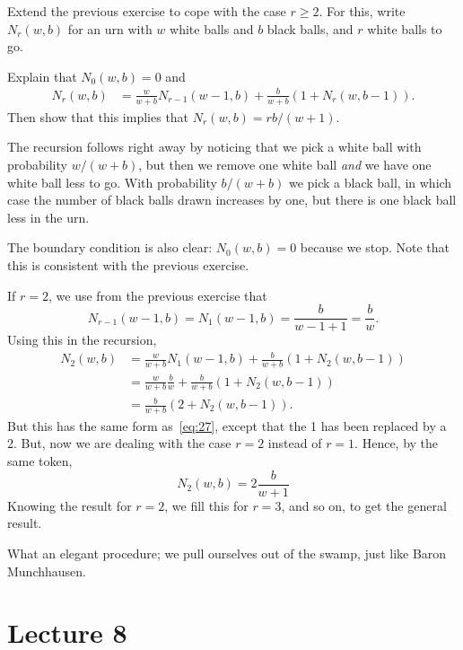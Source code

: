 \begin{exercise}
Extend the previous exercise to cope with the case $r\geq 2$.
For this, write $N_{r}(w,b)$ for an urn with $w$ white balls and $b$ black balls, and $r$ white balls to go.
\begin{hint}
Explain that $N_{0}(w,b) = 0$ and
\begin{align}
  N_r(w,b) &= \frac{w}{w+b} N_{r-1}(w-1, b) +  \frac{b}{w+b} (1+N_{r}(w, b-1)).
\end{align}
Then show that this implies that $N_{r}(w,b) = r b/ (w+1)$.
\end{hint}
\begin{solution}
The recursion follows right away by noticing that we pick a white ball with probability $w/(w+b)$, but then we remove one white ball \emph{and} we have one white ball less to go.
With probability $b/(w+b)$ we pick a black ball, in which case the number of black balls drawn increases by one, but there is one black ball less in the urn.

The boundary condition is also clear: $N_{0}(w,b)=0$ because we stop.
Note that this is consistent with the previous exercise.

If $r=2$, we use from the previous exercise that
\begin{equation*}
N_{r-1}(w-1, b) = N_{1}(w-1, b) = \frac{b }{w-1 + 1} = \frac{b }{w}.
\end{equation*}
Using this in the recursion,
\begin{align*}
  N_2(w,b)
&= \frac{w}{w+b} N_{1}(w-1, b) +  \frac{b}{w+b} (1+N_{2}(w, b-1)) \\
&= \frac{w}{w+b} \frac{b }{w} +  \frac{b}{w+b} (1+N_{2}(w, b-1)) \\
&=  \frac{b}{w+b} (2+N_{2}(w, b-1)).
\end{align*}
But this has the same form as~\cref{eq:27}, except that the 1 has been replaced by a 2. But, now we are dealing with the case $r=2$ instead of $r=1$. Hence, by the same token,
\begin{equation*}
  N_2(w,b) = 2 \frac{b}{w+1}
\end{equation*}
Knowing the result for $r=2$, we fill this for $r=3$, and so on, to get the general result.

What an elegant procedure;  we pull ourselves out of the swamp, just like Baron Munchhausen.
\end{solution}
\end{exercise}

\section{Lecture 8}

